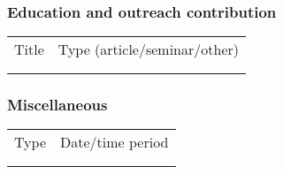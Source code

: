 \subsubsection*{Education and outreach contribution}
{\scriptsize
\begin{tabular}{p{9cm}p{6cm}}
Title &
Type (article/seminar/other)\\
\rowcolor[gray]{0.90}               &           \\
\rowcolor[gray]{0.95}               &           \\
\end{tabular}}

\subsubsection*{Miscellaneous}
{\scriptsize
\begin{tabular}{p{9cm}p{6cm}}
Type &
Date/time period\\
\rowcolor[gray]{0.90}               &           \\
\rowcolor[gray]{0.95}               &           \\
\end{tabular}}
\clearpage
